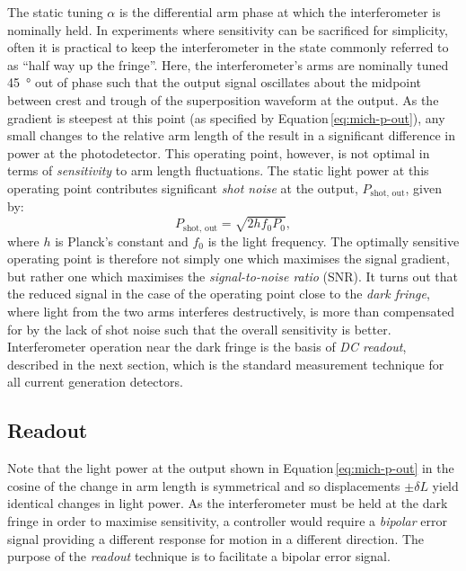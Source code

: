 The static tuning $\alpha$ is the differential arm phase at which the interferometer is nominally held. In experiments where sensitivity can be sacrificed for simplicity, often it is practical to keep the interferometer in the state commonly referred to as ``half way up the fringe''. Here, the interferometer's arms are nominally tuned \SI{45}{\degree} out of phase such that the output signal oscillates about the midpoint between crest and trough of the superposition waveform at the output. As the gradient is steepest at this point (as specified by Equation\,\ref{eq:mich-p-out}), any small changes to the relative arm length of the \MI{} result in a significant difference in power at the photodetector. This operating point, however, is not optimal in terms of \emph{sensitivity} to arm length fluctuations. The static light power at this operating point contributes significant \emph{shot noise} at the output, $P_{\text{shot, out}}$, given by:
\begin{equation}
  P_{\text{shot, out}} = \sqrt{2 h f_0 P_0},
\end{equation}
where $h$ is Planck's constant and $f_0$ is the light frequency. The optimally sensitive operating point is therefore not simply one which maximises the signal gradient, but rather one which maximises the \emph{signal-to-noise ratio} (\gls{SNR}). It turns out that the reduced signal in the case of the operating point close to the \emph{dark fringe}, where light from the two arms interferes destructively, is more than compensated for by the lack of shot noise such that the overall sensitivity is better. Interferometer operation near the dark fringe is the basis of \emph{\gls{DC} readout}, described in the next section, which is the standard measurement technique for all current generation detectors.

\subsection{\label{sec:readout}Readout}
Note that the light power at the output shown in Equation\,\ref{eq:mich-p-out} in the cosine of the change in arm length is symmetrical and so displacements $\pm \delta L$ yield identical changes in light power. As the interferometer must be held at the dark fringe in order to maximise sensitivity, a controller would require a \emph{bipolar} error signal providing a different response for motion in a different direction. The purpose of the \emph{readout} technique is to facilitate a bipolar error signal.

